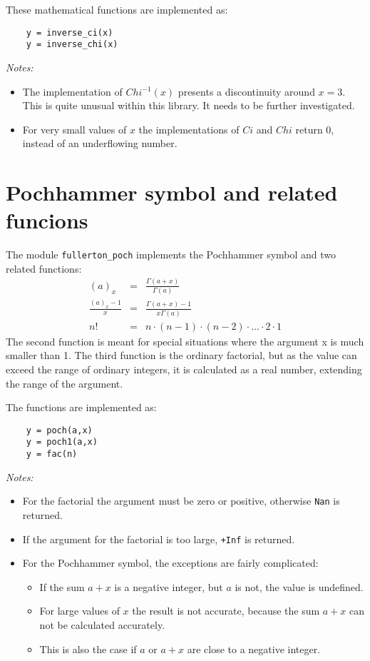 \documentclass{article}
\begin{document}
These mathematical functions are implemented as:
\begin{verbatim}
    y = inverse_ci(x)
    y = inverse_chi(x)
\end{verbatim}

\emph{Notes:}
\begin{itemize}
\item
The implementation of $Chi^{-1}(x)$ presents a discontinuity around $x = 3$. This is
quite unusual within this library. It needs to be further investigated.
\item
For very small values of $x$ the implementations of $Ci$ and $Chi$ return 0, instead of an underflowing number.
\end{itemize}

\section{Pochhammer symbol and related funcions}
The module \verb+fullerton_poch+ implements the Pochhammer symbol and two related functions:
\begin{eqnarray}
    (a)_x             &=& \frac{\Gamma(a+x)}{\Gamma(a)} \\
    \frac{(a)_x-1}{x} &=& \frac{\Gamma(a+x)-1}{ x \Gamma(a)} \\
    n!                &=& n \cdot (n-1) \cdot (n-2) \cdot ... \cdot 2 \cdot 1
\end{eqnarray}
The second function is meant for special situations where the argument x is much smaller than 1.
The third function is the ordinary factorial, but as the value can exceed the range of ordinary integers,
it is calculated as a real number, extending the range of the argument.

The functions are implemented as:
\begin{verbatim}
    y = poch(a,x)
    y = poch1(a,x)
    y = fac(n)
\end{verbatim}

\emph{Notes:}
\begin{itemize}
\item
For the factorial the argument must be zero or positive, otherwise \verb+Nan+ is returned.
\item
If the argument for the factorial is too large, \verb~+Inf~ is returned.
\item
For the Pochhammer symbol, the exceptions are fairly complicated:
    \begin{itemize}
    \item If the sum $a+x$ is a negative integer, but $a$ is not, the value is undefined.
    \item For large values of $x$ the result is not accurate, because the sum $a+x$ can not be calculated accurately.
    \item This is also the case if $a$ or $a+x$ are close to a negative integer.
    \end{itemize}

\end{itemize}
\end{document}
